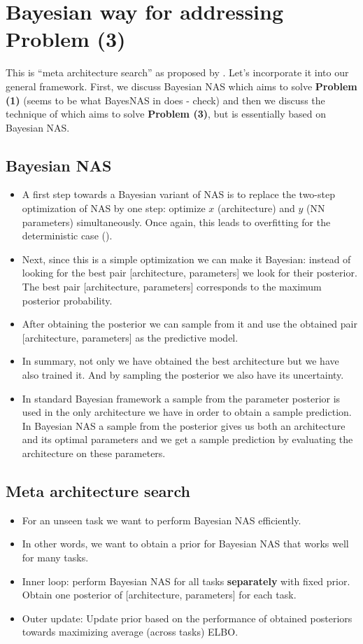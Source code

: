 \section{Bayesian way for addressing Problem (3)}
This is ``meta architecture search'' as proposed by \textcite{shaw2019meta}.
Let's incorporate it into our general framework. 
First, we discuss Bayesian NAS which aims to solve \textbf{Problem (1)} (seems to be what BayesNAS in \cite{zhou2019bayesnas} does - check) and then we discuss the technique of \textcite{shaw2019meta} which aims to solve \textbf{Problem (3)}, but is essentially based on Bayesian NAS.
\subsection{Bayesian NAS}
\begin{itemize}
	\item A first step towards a Bayesian variant of NAS is to replace the two-step optimization of NAS by one step: optimize $x$ (architecture) and $y$ (NN parameters) simultaneously. 
	Once again, this leads to overfitting for the deterministic case (\cite{liu2019darts}).
	\item Next, since this is a simple optimization we can make it Bayesian: instead of looking for the best pair [architecture, parameters] we look for their posterior. 
	The best pair [architecture, parameters] corresponds to the maximum posterior probability. 
	\item After obtaining the posterior we can sample from it and use the obtained pair [architecture, parameters] as the predictive model.
	\item In summary, not only we have obtained the best architecture but we have also trained it.
	And by sampling the posterior we also have its uncertainty.
	\item In standard Bayesian framework a sample from the parameter posterior is used in the only architecture we have in order to obtain a sample prediction. 
	In Bayesian NAS a sample from the posterior gives us both an architecture and its optimal parameters and we get a sample prediction by evaluating the architecture on these parameters.
\end{itemize}

\subsection{Meta architecture search}
\begin{itemize}
	\item For an unseen task we want to perform Bayesian NAS efficiently.
	\item In other words, we want to obtain a prior for Bayesian NAS that works well for many tasks.
	\item Inner loop: perform Bayesian NAS for all tasks \textbf{separately} with fixed prior. 
	Obtain one posterior of [architecture, parameters] for each task. 
	\item Outer update: Update prior based on the performance of obtained posteriors towards maximizing average (across tasks) ELBO.	
\end{itemize}

